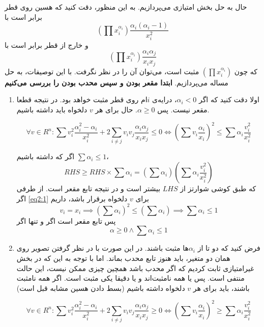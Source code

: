 حال به حل بخش امتیازی می‌پردازیم. به این منظور، دقت کنید که هسین روی قطر برابر است با
\[
(\prod x_i^{\alpha_i} )\frac{\alpha_i (\alpha_i - 1)}{x_i^2}
\]
و خارج از قطر برابر است با
\[
(\prod x_i^{\alpha_i} )\frac{\alpha_i \alpha_j}{x_ix_j}
\]
که چون 
$(\prod x_i^{\alpha_i} )$
مثبت است، می‌توان آن را در نظر نگرفت. با این توصیفات، به حل مساله می‌پردازیم. 
\textbf{ابتدا مقعر بودن و سپس محدب بودن را بررسی می‌کنیم}
\begin{enumerate}
	\item 
اولا دقت کنید که اگر 
$\alpha_i < 0$،
درایه‌ی $i$‌ام روی قطر مثبت خواهد بود. در نتیجه قطعا مقعر نیست. پس
$\alpha \ge 0$.
حال برای هر $v$ دلخواه باید داشته باشیم.

\begin{equation}
\forall v \in R^n : \sum v_i^2\frac{\alpha_i^2 - \alpha_i}{x_i^2} + 2\sum_{i \ne j} v_iv_j\frac{\alpha_i\alpha_j}{x_ix_j} \le 0 \iff 
(\sum v_i\frac{\alpha_i}{x_i})^2 \le \sum \alpha_i\frac{v_i^2}{x_i^2}
\label{eq2:1}
\end{equation}

اگر که داشته باشیم
$\sum \alpha_i \le 1$،
\[
RHS \ge RHS \times \sum \alpha_i = (\sum \alpha_i)(\sum \alpha_i\frac{v_i^2}{x_i^2})
\]
که طبق کوشی شوارتز از
$LHS$
بیشتر است و در نتیجه تابع مقعر است. از طرفی اگر 
\ref{eq2:1}
برای $v$ دلخواه برقرار باشد، داریم
\[
v_i = x_i \implies (\sum \alpha_i)^2 \le (\sum \alpha_i) \implies \sum \alpha_i \le 1
\]
پس تابع مقعر است اگر و تنها اگر
\[
\alpha \ge 0 \land \sum \alpha_i \le 1
\]
\item 
فرض کنید که دو تا از
$\alpha_i$‌ها
مثبت باشند. در این صورت با در نظر گرفتن تصویر روی همان دو متغیر، باید هنوز تابع محدب بماند. اما با توجه به این که در بخش غیرامتیازی ثابت کردیم که اگر محدب باشد همچین چیزی ممکن نیست، این حالت منتفی است. پس یا همه نامثبت‌اند و یا دقیقا یکی مثبت است. اگر همه نامثبت باشند، باید برای هر $v$ دلخواه داشته باشیم (بسط دادن هسین مشابه قبل است)

\begin{equation}
\forall v \in R^n : \sum v_i^2\frac{\alpha_i^2 - \alpha_i}{x_i^2} + 2\sum_{i \ne j} v_iv_j\frac{\alpha_i\alpha_j}{x_ix_j} \ge 0 \iff 
(\sum v_i\frac{\alpha_i}{x_i})^2 \ge \sum \alpha_i\frac{v_i^2}{x_i^2}
\label{eq2:2}
\end{equation}


\end{enumerate}
